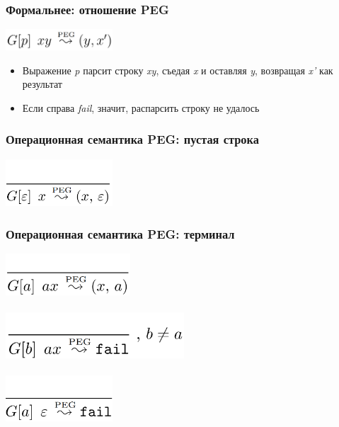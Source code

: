 \documentclass{beamer}
\begin{document}
\begin{frame}[fragile]
  \transwipe[direction=90]
  \frametitle{Формальнее: отношение PEG}
\begin{center}
  \includegraphics[width=0.3\textwidth]{pics/pegRel}
\end{center}                                      
\begin{itemize}
  \item Выражение \textit{p} парсит строку \textit{xy}, съедая \textit{x} и оставляя \textit{y}, возвращая 
\textit{x'} как результат
  \item Если справа \textit{fail}, значит, распарсить строку не удалось
\end{itemize}
\end{frame}

\begin{frame}[fragile]
  \transwipe[direction=90]
  \frametitle{Операционная семантика PEG: пустая строка}
\begin{center}
  \includegraphics[width=0.3\textwidth]{pics/empty}
\end{center}                                      
\end{frame}

\begin{frame}[fragile]
  \transwipe[direction=90]
  \frametitle{Операционная семантика PEG: терминал}
\begin{center}
  \includegraphics[width=0.35\textwidth]{pics/char1}  \\~\\   \pause
  \includegraphics[width=0.5\textwidth]{pics/char2}   \\~\\   \pause
  \includegraphics[width=0.3\textwidth]{pics/char3}
\end{center}  
\end{frame}
\end{document}
